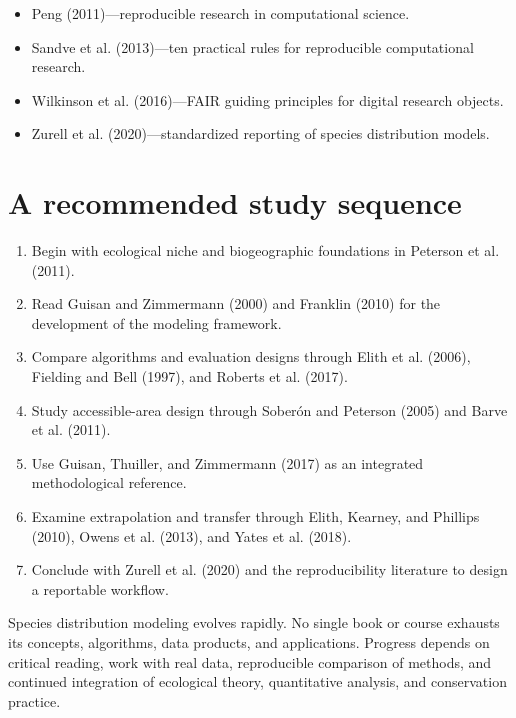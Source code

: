 \begin{itemize}
\item Peng (2011)---reproducible research in computational science.
\item Sandve et al. (2013)---ten practical rules for reproducible computational research.
\item Wilkinson et al. (2016)---FAIR guiding principles for digital research objects.
\item Zurell et al. (2020)---standardized reporting of species distribution models.
\end{itemize}

\section{A recommended study sequence}

\begin{enumerate}
\item Begin with ecological niche and biogeographic foundations in Peterson et al. (2011).
\item Read Guisan and Zimmermann (2000) and Franklin (2010) for the development of the modeling framework.
\item Compare algorithms and evaluation designs through Elith et al. (2006), Fielding and Bell (1997), and Roberts et al. (2017).
\item Study accessible-area design through Soberón and Peterson (2005) and Barve et al. (2011).
\item Use Guisan, Thuiller, and Zimmermann (2017) as an integrated methodological reference.
\item Examine extrapolation and transfer through Elith, Kearney, and Phillips (2010), Owens et al. (2013), and Yates et al. (2018).
\item Conclude with Zurell et al. (2020) and the reproducibility literature to design a reportable workflow.
\end{enumerate}

\begin{dica}[title={\faLightbulb\quad A continuing reading practice}]
Species distribution modeling evolves rapidly. No single book or course exhausts its concepts, algorithms, data products, and applications. Progress depends on critical reading, work with real data, reproducible comparison of methods, and continued integration of ecological theory, quantitative analysis, and conservation practice.
\end{dica}

